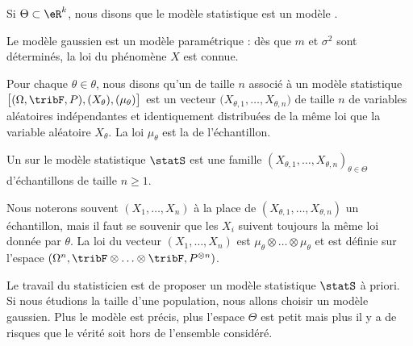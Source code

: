 \begin{definition}
	Si \( \Theta\subset\eR^k\), nous disons que le modèle statistique est un modèle .
\end{definition}
Le modèle gaussien est un modèle paramétrique : dès que \( m\) et \( \sigma^2\) sont déterminés, la loi du phénomène \( X\) est connue.

\begin{definition}
	Pour chaque \( \theta\in\theta\), nous disons qu'un  de taille \( n\) associé à un modèle statistique \( \big[ (\Omega,\tribF,P),(X_{\theta}),(\mu_{\theta}) \big]\) est un vecteur \( \big( X_{\theta,1},\ldots,X_{\theta,n} \big)\) de taille \( n\) de variables aléatoires indépendantes et identiquement distribuées de la même loi que la variable aléatoire \( X_{\theta}\). La loi \( \mu_{\theta}\) est la  de l'échantillon.
\end{definition}

\begin{definition}
	Un  sur le modèle statistique \( \statS\) est une famille \( (X_{\theta,1},\ldots, X_{\theta,n})_{\theta\in\Theta}\) d'échantillons de taille \( n\geq 1\).
\end{definition}

Nous noterons souvent \( (X_1,\ldots,X_n)\) à la place de \( (X_{\theta,1},\ldots,X_{\theta,n})\) un échantillon, mais il faut se souvenir que les \( X_i\) suivent toujours la même loi donnée par \( \theta\). La loi du vecteur \( (X_1,\ldots,X_n)\) est \( \mu_{\theta}\otimes\ldots\otimes\mu_{\theta}\) et est définie sur l'espace \( (\Omega^n,\tribF\otimes\ldots\otimes\tribF,P^{\otimes n})\).

\begin{remark}
	Le travail du statisticien est de proposer un modèle statistique \( \statS\) à priori. Si nous étudions la taille d'une population, nous allons choisir un modèle gaussien. Plus le modèle est précis, plus l'espace \( \Theta\) est petit mais plus il y a de risques que le vérité soit hors de l'ensemble considéré.
\end{remark}

